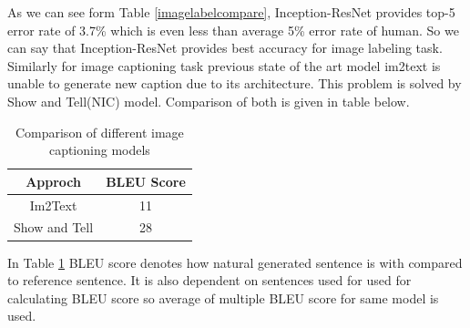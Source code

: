 As we can see form Table \ref{imagelabelcompare}, Inception-ResNet provides top-5 error rate of 3.7\% which is even less than average 5\% error rate of human. So we can say that Inception-ResNet provides best accuracy for image labeling task. \\

Similarly for image captioning task previous state of the art model im2text is unable to generate new caption due to its architecture. This problem is solved by Show and Tell(NIC) model. Comparison of both is given in table below.
\begin{table}[H]
\caption{Comparison of different image captioning models}
\label{imagecaptioncompare}
\begin{centering}
\begin{tabular}{|c|c|}
\hline
\textbf{Approch} & \textbf{BLEU Score}\tabularnewline
\hline
\hline
Im2Text \cite{ordonez2011im2text} & 11\tabularnewline
\hline
Show and Tell \cite{7505636} & 28\tabularnewline
\hline
\end{tabular}
\par\end{centering}

\end{table}

In Table \ref{imagecaptioncompare} BLEU score denotes how natural generated sentence is with compared to reference sentence. It is also dependent on sentences used for used for calculating BLEU score so average of multiple BLEU score for same model is used. 